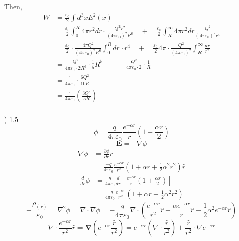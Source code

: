 \documentclass[letterpage]{article}
\begin{document}
Then,
\begin{align*}
  W &= \frac{\varepsilon_0}{2} \int d^3x E^2(x)\\
  &= \frac{\varepsilon_0}{2} \int_0^R 4\pi r^2 dr \cdot 
  \frac{Q^2 r^2}{\left(4\pi \varepsilon_0 \right)^2 R^6} \quad + \quad 
  \frac{\varepsilon_0}{2}
  \int_R^\infty 4\pi r^2 dr \frac{Q^2}{\left(4\pi \varepsilon_0 \right)^2 r^4}\\
  &= \frac{\varepsilon_0}{2} \cdot \frac{4\pi Q^2}
  {\left(4\pi \varepsilon_0 \right)^2 R^6} \int_0^R dr \cdot r^4 \quad + \quad
  \frac{\varepsilon_0}{2} 4\pi \cdot \frac{Q^2}{(4\pi \varepsilon_0)^2}
  \int_R^\infty \frac{dr}{r^2}\\
  &= \frac{Q^2}{4\pi \varepsilon_0 \cdot 2R^6} \cdot \frac{1}{5} R^5 \quad +
  \quad \frac{Q^2}{4\pi \varepsilon_0 \cdot 2} \cdot \frac{1}{R}\\
  &= \frac{1}{4\pi \varepsilon_0} \cdot \frac{6Q^2}{10R}\\
  &= \frac{1}{4\pi \varepsilon_0} \left(\frac{3Q^2}{5R}\right)
\end{align*}\\
) 1.5
\begin{equation*}
  \phi = \frac{q}{4\pi \varepsilon_0} \frac{e^{-\alpha r}}{r} 
  \left(1+ \frac{\alpha r}{2} \right)
\end{equation*}
\begin{equation*}
  \textbf{E} = -\nabla \phi
\end{equation*}
\begin{align*}
  \nabla \phi &= \frac{\partial \phi}{\partial r} \hat{r}\\
  &= \frac{-q}{4\pi \varepsilon_0} \frac{e^{-\alpha r}}{r^2} 
  \left(1 + \alpha r + \frac{1}{2} \alpha ^2 r^2 \right) \hat{r}
\end{align*}
\begin{align*}
  \frac{d}{dr} \phi &= \frac{q}{4\pi \varepsilon_0} \frac{d}{dr} 
  \left[\frac{e^{-\alpha r}}{r} \left(1+\frac{\alpha r}{2} \right)\right]\\
  &= \frac{-q}{4\pi \varepsilon_0} \frac{e^{-\alpha r}}{r^2} 
  \left(1+\alpha r + \frac{1}{2} \alpha ^2 r^2 \right)
\end{align*}
\begin{equation*}
  -\frac{\rho_{(r)}}{\varepsilon_0} = \nabla ^2 \phi = 
  \nabla \cdot \nabla \phi
  = -\frac{q}{4\pi \varepsilon_0} \nabla \cdot
  \left(\frac{e^{-\alpha r}}{r^2} \hat{r}+ \frac{\alpha e^{-\alpha r}}{r}
  \hat{r} + \frac{1}{2} \alpha ^2 e^{-\alpha r} \hat{r} \right)
\end{equation*}
\begin{equation*}
  \nabla \cdot \frac{e^{-\alpha r}}{r^2} \hat{r} = \mathbf{\nabla}
  \left(e^{-\alpha r} \frac{\hat{r}}{r^2} \right) = e^{-\alpha r} \left(\nabla
  \cdot \frac{\hat{r}}{r^2} \right) + \frac{\hat{r}}{r^2} \cdot \nabla e^{-\alpha r}
\end{equation*}
\end{document}
